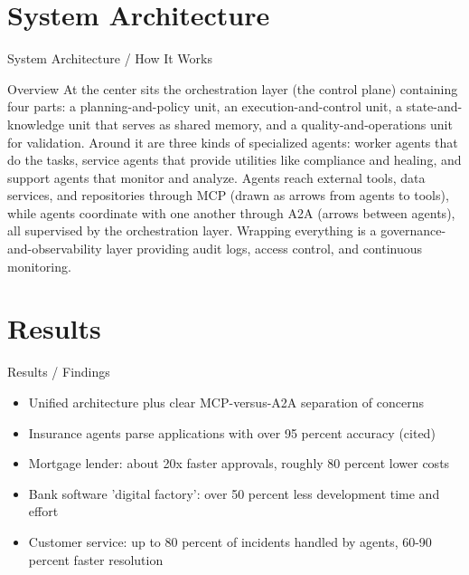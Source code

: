 \documentclass[10pt]{beamer}
\begin{document}
\section{System Architecture}
\begin{frame}{System Architecture / How It Works}
  \begin{block}{Overview}
  At the center sits the orchestration layer (the control plane) containing four parts: a planning-and-policy unit, an execution-and-control unit, a state-and-knowledge unit that serves as shared memory, and a quality-and-operations unit for validation. Around it are three kinds of specialized agents: worker agents that do the tasks, service agents that provide utilities like compliance and healing, and support agents that monitor and analyze. Agents reach external tools, data services, and repositories through MCP (drawn as arrows from agents to tools), while agents coordinate with one another through A2A (arrows between agents), all supervised by the orchestration layer. Wrapping everything is a governance-and-observability layer providing audit logs, access control, and continuous monitoring.
  \end{block}
\end{frame}

\section{Results}
\begin{frame}[allowframebreaks]{Results / Findings}
\begin{itemize}
  \item Unified architecture plus clear MCP-versus-A2A separation of concerns
  \item Insurance agents parse applications with over 95 percent accuracy (cited)
  \item Mortgage lender: about 20x faster approvals, roughly 80 percent lower costs
  \item Bank software 'digital factory': over 50 percent less development time and effort
  \item Customer service: up to 80 percent of incidents handled by agents, 60-90 percent faster resolution
\end{itemize}
\end{frame}
\end{document}
